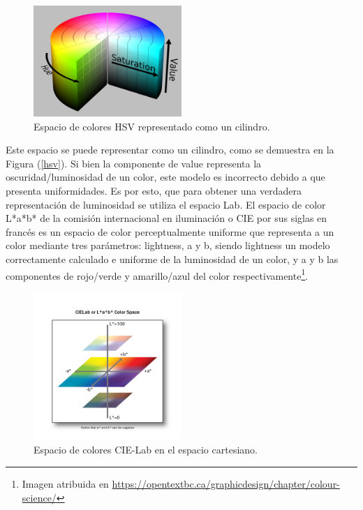 \begin{figure}[H]
		\centering
		\includegraphics[width=0.5\textwidth]{Imagenes/hsv.png}
		\caption{Espacio de colores HSV representado como un cilindro.}
		\label{fig:hsv}
\end{figure}

Este espacio se puede representar como un cilindro, como se demuestra en la Figura (\ref{hsv}). Si bien la componente de value representa la oscuridad/luminosidad de un color, este modelo es incorrecto debido a que presenta uniformidades. Es por esto, que para obtener una verdadera representación de luminosidad se utiliza el espacio Lab.
El espacio de color L*a*b* de la comisión internacional en iluminación o CIE por sus siglas en francés es un espacio de color perceptualmente uniforme que representa a un color mediante tres parámetros: lightness, a y b, siendo lightness un modelo correctamente calculado e uniforme de la luminosidad de un color, y a y b las componentes de rojo/verde y amarillo/azul del color respectivamente\footnote{Imagen atribuida en \href{https://opentextbc.ca/graphicdesign/chapter/colour-science/}{https:\slash \slash opentextbc.ca\slash graphicdesign\slash chapter\slash colour-science\slash}}.
\begin{figure}[H]
		\centering
		\includegraphics[width=0.5\textwidth]{Imagenes/lab.png}
		\caption{Espacio de colores CIE-Lab en el espacio cartesiano.}
		\label{fig:lab}
\end{figure}

